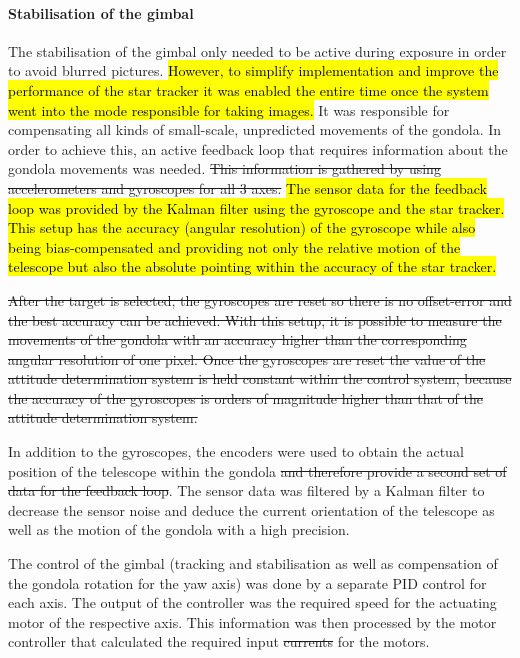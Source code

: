 \paragraph{Stabilisation of the gimbal}

The stabilisation of the gimbal only needed to be active during exposure in order to avoid blurred pictures. \hl{However, to simplify implementation and improve the performance of the star tracker it was enabled the entire time once the system went into the mode responsible for taking images.} It was responsible for compensating all kinds of small-scale, unpredicted movements of the gondola. In order to achieve this, an active feedback loop that requires information about the gondola movements was needed. \st{This information is gathered by using accelerometers and gyroscopes for all 3 axes.} \hl{The sensor data for the feedback loop was provided by the Kalman filter using the gyroscope and the star tracker. This setup has the accuracy (angular resolution) of the gyroscope while also being bias-compensated and providing not only the relative motion of the telescope but also the absolute pointing within the accuracy of the star tracker.}

\st{After the target is selected, the gyroscopes are reset so there is no offset-error and the best accuracy can be achieved. With this setup, it is possible to measure the movements of the gondola with an accuracy higher than the corresponding angular resolution of one pixel. Once the gyroscopes are reset the value of the attitude determination system is held constant within the control system, because the accuracy of the gyroscopes is orders of magnitude higher than that of the attitude determination system. }

In addition to the gyroscopes, the encoders were used to obtain the actual position of the telescope within the gondola\st{ and therefore provide a second set of data for the feedback loop}. The sensor data was filtered by a Kalman filter to decrease the sensor noise and deduce the current orientation of the telescope as well as the motion of the gondola with a high precision.

The control of the gimbal (tracking and stabilisation as well as compensation of the gondola rotation for the yaw axis) was done by a separate PID control for each axis. The output of the controller was the required speed for the actuating motor of the respective axis. This information was then processed by the motor controller that calculated the required input \st{currents} for the motors.

